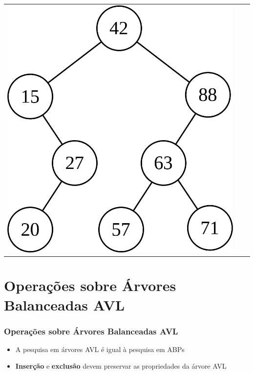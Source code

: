 \documentclass[aspectratio=169]{beamer}
\begin{document}
\begin{frame}[fragile]
\begin{enumerate}
\begin{tabular}{lll}
\includegraphics[height=0.4\paperheight]{imagens/avl10.png} \\
\end{tabular}
\end{enumerate}
\end{frame}

\section{Operações sobre Árvores Balanceadas AVL}

\begin{frame}\frametitle{Operações sobre Árvores Balanceadas AVL}
\begin{itemize}
	\item A pesquisa em árvores AVL é igual à pesquisa em ABPs
	\item \textbf{Inserção} e \textbf{exclusão} devem preservar as propriedades da árvore AVL
\end{itemize}
\end{frame}
\end{document}
